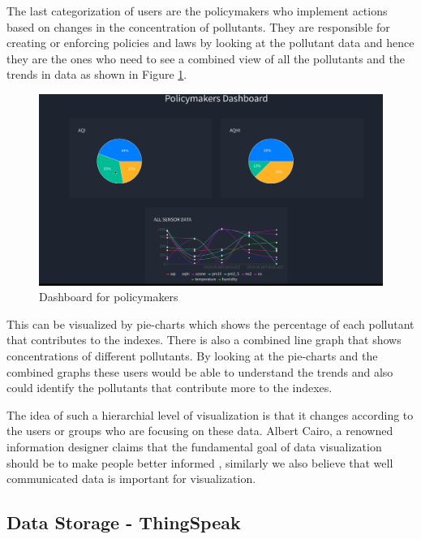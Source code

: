 \hspace{1 cm}

The last categorization of users are the policymakers who implement actions based on changes in the concentration of pollutants. They are responsible for creating or enforcing policies and laws by looking at the pollutant data and hence they are the ones who need to see a combined view of all the pollutants and the trends in data as shown in Figure \ref{view3}.

\begin{figure}[h!]
  \begin{center}
  \includegraphics[scale=0.45]{./images/figure16.png}
  \end{center}
  \caption{Dashboard for policymakers}
  \label{view3}
\end{figure}

\hspace{1 cm}

This can be visualized by pie-charts which shows the percentage of each pollutant that contributes to the indexes. There is also a combined line graph that shows concentrations of different pollutants. By looking at the pie-charts and the combined graphs these users would be able to understand the trends and also could identify the pollutants that contribute more to the indexes. 

The idea of such a hierarchial level of visualization is that it changes according to the users or groups who are focusing on these data. Albert Cairo, a renowned information designer claims that the fundamental goal of data visualization should be to make people better informed \cite{Hepworth} \cite{Cairo2014},  similarly we also believe that well communicated data is important for visualization.


\subsection{Data Storage - ThingSpeak}


